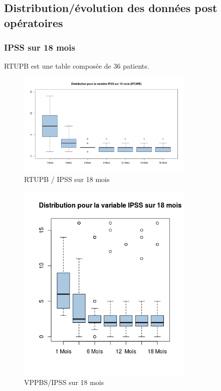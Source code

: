 %
%
\subsection{Distribution/évolution des données post opératoires}

\subsubsection{IPSS sur 18 mois }

RTUPB est une table composée de 36 patients. 
	
\begin{figure}[!h]
\centering
\includegraphics[width=0.75\textwidth]{../Fig/RTUPB/rtupb-boxplot-post-ipss}
\caption{RTUPB / IPSS sur 18 mois}
\end{figure}	
	
\begin{figure}[!h]
\centering
\includegraphics[width=0.75\textwidth]{../Fig/VPPBS/vppbs-boxplot-post-ipss}
\caption{VPPBS/IPSS sur 18 mois}
\end{figure}


